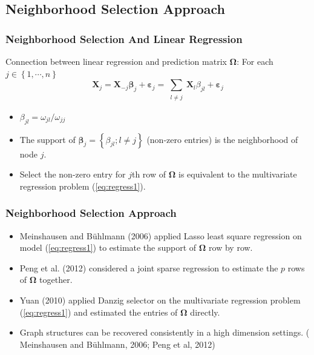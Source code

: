 \documentclass{beamer}
\newcommand{\bX}{\mathbf X}
\newcommand{\bbeta}{{\boldsymbol{\beta}}}
\newcommand{\bvarepsilon}{\boldsymbol{\varepsilon}}
\newcommand{\bOmega}{{\boldsymbol{\Omega}}}
\begin{document}
\subsection{Neighborhood Selection Approach}
\begin{frame}
	\frametitle{Neighborhood Selection And Linear Regression}
	\pause
	Connection between linear regression and prediction matrix $\bOmega$: For each $j \in \left\{1 , \cdots, n\right\}$
	\begin{equation}
	\label{eq:regress1}
	\bX_j = \bX_{-j} \bbeta_j + \bvarepsilon_j = \sum_{\substack{l \neq j}} \bX_l \beta_{jl} + \bvarepsilon_j
	\end{equation}
	\begin{itemize}[<+->]
		\item $\beta_{jl} = \omega_{jl}/\omega_{jj}$
		\item The support of $\bbeta_j = \left\{\beta_{jl}; l \neq j \right\}$ (non-zero entries) is the neighborhood of node $j$. 
		\item Select the non-zero entry for $j$th row of $\bOmega$ is equivalent to the multivariate regression problem (\ref{eq:regress1}).     
	\end{itemize}
	
\end{frame}


\begin{frame}
	\frametitle{Neighborhood Selection Approach}
	
	\begin{itemize}[<+->]
		\item Meinshausen and B{\"u}hlmann (2006) applied Lasso least square regression on model (\ref{eq:regress1}) to estimate the support of $\bOmega$ row by row.
		\item Peng et al. (2012) considered a joint sparse regression to estimate the $p$ rows of $\bOmega$ together.
		\item Yuan (2010) applied Danzig selector on the multivariate regression problem (\ref{eq:regress1}) and estimated the entries of $\bOmega$ directly.   
		\item Graph structures can be recovered consistently in a high dimension settings. ( Meinshausen and B{\"u}hlmann, 2006; Peng et al, 2012) 
	\end{itemize}
	
\end{frame}
\end{document}
